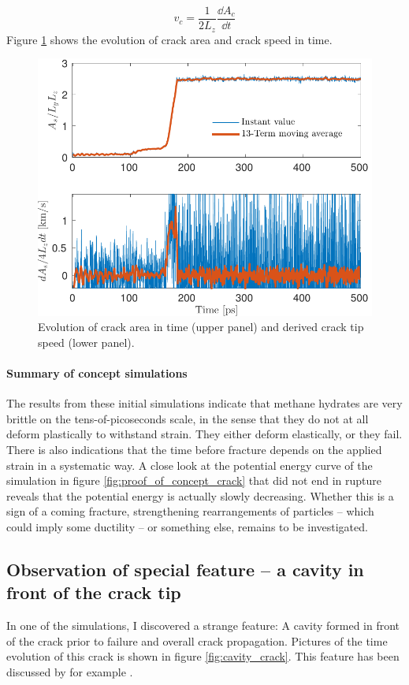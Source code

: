 \begin{equation}
v_c = \frac{1}{2L_z}\frac{\dd A_c}{\dd t}
\end{equation}
%
Figure \ref{fig:crack_in_time_thin} shows the evolution of crack area and crack speed in time.
\begin{figure}
\centering
\includegraphics[width=12cm]{../figures/thesis/crack_in_time_thin.pdf}
\caption{Evolution of crack area in time (upper panel) and derived crack tip speed (lower panel).}
\label{fig:crack_in_time_thin}
\end{figure}

\paragraph{Summary of concept simulations} The results from these initial simulations indicate that methane hydrates are very brittle on the tens-of-picoseconds scale, in the sense that they do not at all deform plastically to withstand strain. They either deform elastically, or they fail. There is also indications that the time before fracture depends on the applied strain in a systematic way. A close look at the potential energy curve of the simulation in figure \ref{fig:proof_of_concept_crack} that did not end in rupture reveals that the potential energy is actually slowly decreasing. Whether this is a sign of a coming fracture, strengthening rearrangements of particles -- which could imply some ductility -- or something else, remains to be investigated. 

\subsection{Observation of special feature -- a cavity in front of the crack tip}
In one of the simulations, I discovered a strange feature: A cavity formed in front of the crack prior to failure and overall crack propagation. Pictures of the time evolution of this crack is shown in figure \ref{fig:cavity_crack}. This feature has been discussed by for example \citet{Bouchbinder2004}.

